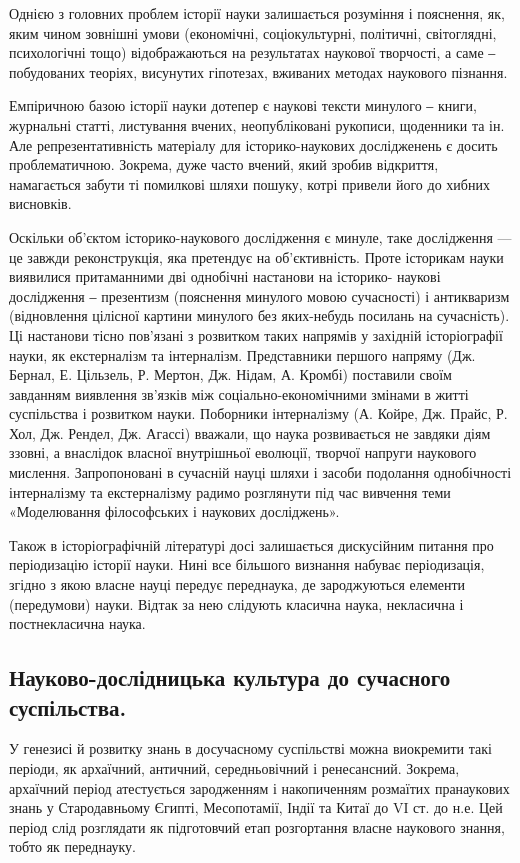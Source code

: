 Однією з головних проблем історії науки залишається розуміння і
пояснення, як, яким чином зовнішні умови (економічні, соціокультурні,
політичні, світоглядні, психологічні тощо) відображаються на результатах
наукової творчості, а саме ‒ побудованих теоріях, висунутих гіпотезах,
вживаних методах наукового пізнання.

Емпіричною базою історії науки дотепер є наукові тексти минулого ‒ книги,
журнальні статті, листування вчених, неопубліковані рукописи, щоденники та
ін. Але репрезентативність матеріалу для історико-наукових дослідженень є
досить проблематичною. Зокрема, дуже часто вчений, який зробив відкриття,
намагається забути ті помилкові шляхи пошуку, котрі привели його до хибних
висновків.

Оскільки об’єктом історико-наукового дослідження є минуле, таке
дослідження --- це завжди реконструкція, яка претендує на об’єктивність. Проте
історикам науки виявилися притаманними дві однобічні настанови на історико-
наукові дослідження ‒ презентизм (пояснення минулого мовою сучасності) і
антикваризм (відновлення цілісної картини минулого без яких-небудь посилань
на сучасність). Ці настанови тісно пов’язані з розвитком таких напрямів у
західній історіографії науки, як екстерналізм та інтерналізм. Представники
першого напряму (Дж. Бернал, Е. Цільзель, Р. Мертон, Дж. Нідам, А. Кромбі)
поставили своїм завданням виявлення зв’язків між соціально-економічними
змінами в житті суспільства і розвитком науки. Поборники інтерналізму (А.
Койре, Дж. Прайс, Р. Хол, Дж. Рендел, Дж. Агассі) вважали, що наука
розвивається не завдяки діям ззовні, а внаслідок власної внутрішньої еволюції,
творчої напруги наукового мислення. Запропоновані в сучасній науці шляхи і
засоби подолання однобічності інтерналізму та екстерналізму радимо
розглянути під час вивчення теми «Моделювання філософських і наукових
досліджень».

Також в історіографічній літературі досі залишається дискусійним питання
про періодизацію історії науки. Нині все більшого визнання набуває
періодизація, згідно з якою власне науці передує переднаука, де зароджуються
елементи (передумови) науки. Відтак за нею слідують класична наука,
некласична і постнекласична наука.

\subsection{Науково-дослідницька культура до сучасного суспільства.} У генезисі
й розвитку знань в досучасному суспільстві можна виокремити такі періоди, як
архаїчний, античний, середньовічний і ренесансний. Зокрема, архаїчний період
атестується зародженням і накопиченням розмаїтих пранаукових знань у
Стародавньому Єгипті, Месопотамії, Індії та Китаї до VI ст. до н.е. Цей період
слід розглядати як підготовчий етап розгортання власне наукового знання,
тобто як переднауку.

